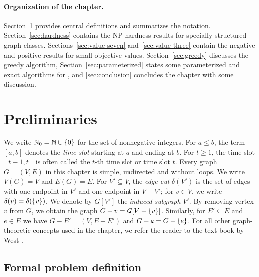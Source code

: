 \paragraph{Organization of the chapter.}
Section~\ref{sec:notation} provides central definitions and summarizes the notation.
Section~\ref{sec:hardness} contains the NP-hardness results for specially structured graph classes. 
Sections~\ref{sec:value-seven} and~\ref{sec:value-three} contain the negative and positive results 
for small objective values. 
Section~\ref{sec:greedy} discusses the greedy algorithm, 
Section~\ref{sec:parameterized} states some parameterized and exact algorithms for {\xxxNTP}, and
\cref{sec:conclusion} concludes the chapter with some discussion.


\section{Preliminaries}
\label{sec:notation}

We write $\mathbb{N}_0= \mathbb{N} \cup \{ 0 \}$ for the set of nonnegative integers. 
For $a\le b$, the term $[a,b]$ denotes the \emph{time slot} starting at $a$ and ending at $b$. 
For  $t\ge1$, the time slot $[t-1,t]$ is often called the $t$-th time slot or time slot $t$.
Every graph $G=(V,E)$ in this chapter is simple, undirected and without loops. We write $V(G) = V$ and $E(G) = E$.
For $V'\subseteq V$, the \emph{edge cut} $\delta(V')$ is the set of edges with one endpoint 
in $V'$ and one endpoint in $V-V'$; for $v\in V$, we write $\delta(v) = \delta(\{ v \})$.
We denote by $G[V']$ the \emph{induced subgraph}  $V'$.
By removing  vertex $v$ from $G$, we obtain the graph $G-v=G[V-\{ v \}]$.
Similarly, for $E'\subseteq E$ and $e\in E$ we have $G-E'=(V,E-E')$ and $G-e=G-\{ e \}$. For all other graph-theoretic concepts used in the chapter, we refer the reader to the
text book by West \cite{WestBook}.

\subsection{Formal problem definition}

